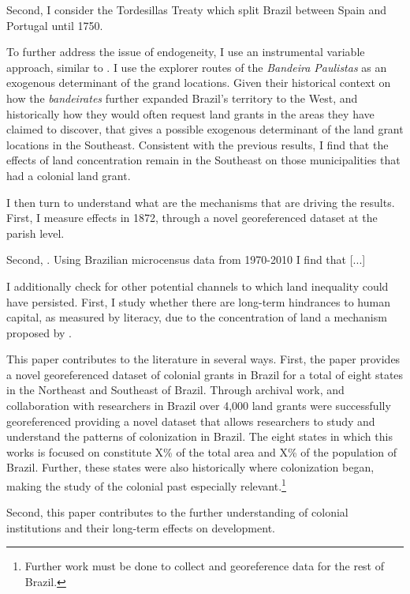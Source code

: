 \documentclass{article}
\begin{document}
Second, I consider the Tordesillas Treaty which split Brazil between Spain and Portugal until 1750. 


To further address the issue of endogeneity, I use an instrumental variable approach, similar to \textcite{Duranton2011-rv}. 
I use the explorer routes of the \textit{Bandeira Paulistas} as an exogenous determinant of the grand locations. 
Given their historical context on how the \textit{bandeirates} further expanded Brazil's territory to the West, and historically how they would often request land grants in the areas they have claimed to discover, that gives a possible exogenous determinant of the land grant locations in the Southeast. 
Consistent with the previous results, I find that the effects of land concentration remain in the Southeast on those municipalities that had a colonial land grant. 



I then turn to understand what are the mechanisms that are driving the results. 
First, I measure effects in 1872, through a novel georeferenced dataset at the parish level. 


Second, .
Using Brazilian microcensus data from 1970-2010 I find that [...]

I additionally check for other potential channels to which land inequality could have persisted. First, I study whether there are long-term hindrances to human capital, as measured by literacy, due to the concentration of land a mechanism proposed by \textcite{Galor2009-bc}. 

This paper contributes to the literature in several ways. 
First, the paper provides a novel georeferenced dataset of colonial grants in Brazil for a total of eight states in the Northeast and Southeast of Brazil.
Through archival work, and collaboration with researchers in Brazil over 4,000 land grants were successfully georeferenced providing a novel dataset that allows researchers to study and understand the patterns of colonization in Brazil.
The eight states in which this works is focused on constitute X\% of the total area and X\% of the population of Brazil.
Further, these states were also historically where colonization began, making the study of the colonial past especially relevant.\footnote{Further work must be done to collect and georeference data for the rest of Brazil.}

Second, this paper contributes to the further understanding of colonial institutions and their long-term effects on development. \parencite{Acemoglu2005-ti}
\end{document}
